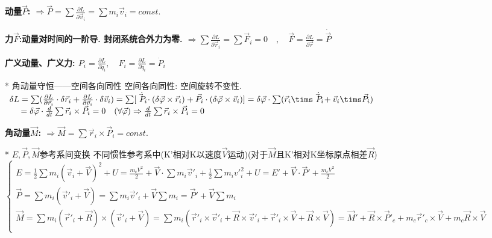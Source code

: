         \bf{动量$\vec P$: }
            $\Rightarrow \vec P = \sum \frac{\partial L}{\partial \vec v_i} = \sum m_i \vec v_i = const.$
    
        \bf{力$\vec F$}:动量对时间的一阶导. \quad 封闭系统合外力为零.
            $\Rightarrow \sum \frac{\partial L}{\partial \vec r_i} = \sum \vec F_i = 0 \quad , \quad \vec F = \frac{\partial L}{\partial \vec r} = \dot{ \vec P }$
    
        \bf{广义动量、广义力}:
            $P_i = \frac{\partial L}{\partial \dot q_i},\quad F_i = \frac{\partial L}{\partial \dot q_i} = \dot P_i$


    * 角动量守恒——空间各向同性
        空间各向同性: 空间旋转不变性.
            $
            \begin{array}{ll}
            \delta L = \sum (\frac{\partial L}{\partial \vec r_i} \cdot \delta \vec r_i + \frac{\partial L}{\partial \vec v_i} \cdot \delta \vec v_i) = \sum [\dot{\vec P_i} \cdot (\delta \vec \varphi \times \vec r_i) + \vec P_i \cdot ( \delta \vec \varphi \times \vec v_i )]
             = \delta \vec \varphi \cdot \sum (\vec r_i \tims \dot{\vec P_i} + \vec v_i \tims \vec P_i) \\
             \quad\  = \delta \vec \varphi \cdot \frac{d}{dt} \sum \vec r_i \times \vec P_i = 0\quad(\forall \vec \varphi) \Rightarrow \frac{d}{dt}\sum \vec r_i \times \vec P_i = 0
            \end{array}
            $
        
        \bf{角动量$\vec M$: }
            $\Rightarrow \vec M = \sum \vec r_i \times \vec P_i = const.$


    * $E,\vec P,\vec M$参考系间变换
        不同惯性参考系中(K'相对K以速度$\vec V$运动)(对于$\vec M$且K'相对K坐标原点相差$\vec R$)\\
            $
                \left\{ \begin{array}{ll}
                E = \frac{1}{2} \sum m_i(\vec v_i + \vec V)^2 + U = \frac{m_c V^2}{2} + \vec V \cdot \sum m_i \vec v'_i + \frac{1}{2} \sum m_i v'_i^2 + U = E' + \vec V \cdot \vec P' + \frac{m_c V^2}{2}\\
                \vec P = \sum m_i (\vec v'_i + \vec V) = \sum m_i \vec v'_i + \vec V \sum m_i = \vec P' + \vec V \sum m_i\\
                \vec M = \sum m_i (\vec r'_i + \vec R) \times (\vec v'_i + \vec V) = \sum m_i( \vec r'_i \times \vec v'_i +  \vec R \times \vec v'_i + \vec r'_i \times \vec V + \vec R \times \vec V)
             = \vec M' + \vec R \times \vec P'_c + m_c \vec r'_c \times \vec V + m_c \vec R \times \vec V\\
                \end{array} \right.
            $


